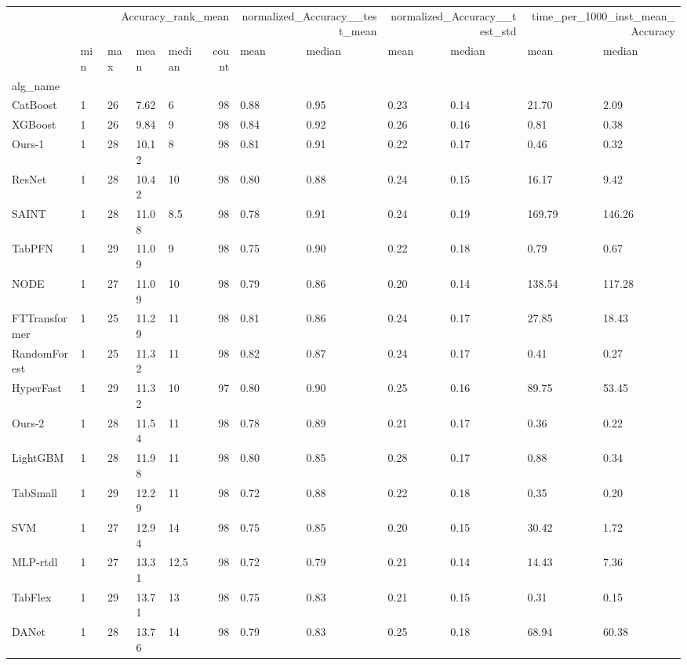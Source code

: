 \begin{tabular}{lllllrllllll}
\toprule
 & \multicolumn{5}{r}{Accuracy_rank_mean} & \multicolumn{2}{r}{normalized_Accuracy__test_mean} & \multicolumn{2}{r}{normalized_Accuracy__test_std} & \multicolumn{2}{r}{time_per_1000_inst_mean_Accuracy} \\
 & min & max & mean & median & count & mean & median & mean & median & mean & median \\
alg_name &  &  &  &  &  &  &  &  &  &  &  \\
\midrule
CatBoost & 1 & 26 & 7.62 & 6 & 98 & 0.88 & 0.95 & 0.23 & 0.14 & 21.70 & 2.09 \\
XGBoost & 1 & 26 & 9.84 & 9 & 98 & 0.84 & 0.92 & 0.26 & 0.16 & 0.81 & 0.38 \\
Ours-1 & 1 & 28 & 10.12 & 8 & 98 & 0.81 & 0.91 & 0.22 & 0.17 & 0.46 & 0.32 \\
ResNet & 1 & 28 & 10.42 & 10 & 98 & 0.80 & 0.88 & 0.24 & 0.15 & 16.17 & 9.42 \\
SAINT & 1 & 28 & 11.08 & 8.5 & 98 & 0.78 & 0.91 & 0.24 & 0.19 & 169.79 & 146.26 \\
TabPFN & 1 & 29 & 11.09 & 9 & 98 & 0.75 & 0.90 & 0.22 & 0.18 & 0.79 & 0.67 \\
NODE & 1 & 27 & 11.09 & 10 & 98 & 0.79 & 0.86 & 0.20 & 0.14 & 138.54 & 117.28 \\
FTTransformer & 1 & 25 & 11.29 & 11 & 98 & 0.81 & 0.86 & 0.24 & 0.17 & 27.85 & 18.43 \\
RandomForest & 1 & 25 & 11.32 & 11 & 98 & 0.82 & 0.87 & 0.24 & 0.17 & 0.41 & 0.27 \\
HyperFast & 1 & 29 & 11.32 & 10 & 97 & 0.80 & 0.90 & 0.25 & 0.16 & 89.75 & 53.45 \\
Ours-2 & 1 & 28 & 11.54 & 11 & 98 & 0.78 & 0.89 & 0.21 & 0.17 & 0.36 & 0.22 \\
LightGBM & 1 & 28 & 11.98 & 11 & 98 & 0.80 & 0.85 & 0.28 & 0.17 & 0.88 & 0.34 \\
TabSmall & 1 & 29 & 12.29 & 11 & 98 & 0.72 & 0.88 & 0.22 & 0.18 & 0.35 & 0.20 \\
SVM & 1 & 27 & 12.94 & 14 & 98 & 0.75 & 0.85 & 0.20 & 0.15 & 30.42 & 1.72 \\
MLP-rtdl & 1 & 27 & 13.31 & 12.5 & 98 & 0.72 & 0.79 & 0.21 & 0.14 & 14.43 & 7.36 \\
TabFlex & 1 & 29 & 13.71 & 13 & 98 & 0.75 & 0.83 & 0.21 & 0.15 & 0.31 & 0.15 \\
DANet & 1 & 28 & 13.76 & 14 & 98 & 0.79 & 0.83 & 0.25 & 0.18 & 68.94 & 60.38 \\

\end{tabular}

